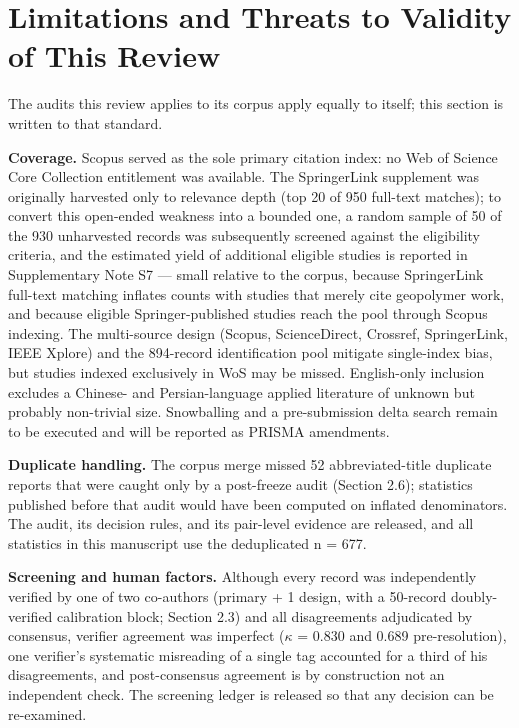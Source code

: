 \documentclass[pdflatex,sn-basic]{sn-jnl}
\begin{document}
\section{Limitations and Threats to Validity of This Review}

The audits this review applies to its corpus apply equally to itself; this section is written to that standard.

\textbf{Coverage.} Scopus served as the sole primary citation index: no Web of Science Core Collection entitlement was available. The SpringerLink supplement was originally harvested only to relevance depth (top 20 of 950 full-text matches); to convert this open-ended weakness into a bounded one, a random sample of 50 of the 930 unharvested records was subsequently screened against the eligibility criteria, and the estimated yield of additional eligible studies is reported in Supplementary Note S7 --- small relative to the corpus, because SpringerLink full-text matching inflates counts with studies that merely cite geopolymer work, and because eligible Springer-published studies reach the pool through Scopus indexing. The multi-source design (Scopus, ScienceDirect, Crossref, SpringerLink, IEEE Xplore) and the 894-record identification pool mitigate single-index bias, but studies indexed exclusively in WoS may be missed. English-only inclusion excludes a Chinese- and Persian-language applied literature of unknown but probably non-trivial size. Snowballing and a pre-submission delta search remain to be executed and will be reported as PRISMA amendments.

\textbf{Duplicate handling.} The corpus merge missed 52 abbreviated-title duplicate reports that were caught only by a post-freeze audit (Section 2.6); statistics published before that audit would have been computed on inflated denominators. The audit, its decision rules, and its pair-level evidence are released, and all statistics in this manuscript use the deduplicated n = 677.

\textbf{Screening and human factors.} Although every record was independently verified by one of two co-authors (primary + 1 design, with a 50-record doubly-verified calibration block; Section 2.3) and all disagreements adjudicated by consensus, verifier agreement was imperfect ($\kappa$ = 0.830 and 0.689 pre-resolution), one verifier's systematic misreading of a single tag accounted for a third of his disagreements, and post-consensus agreement is by construction not an independent check. The screening ledger is released so that any decision can be re-examined.
\end{document}

